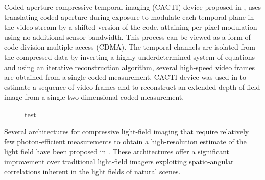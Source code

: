 \documentclass[journal]{IEEEtran}
\begin{document}
Coded aperture compressive temporal imaging (CACTI) device proposed in \cite{Llull2013}, uses translating coded aperture during exposure to modulate each temporal plane in the video stream by a shifted version of the code, attaining per-pixel modulation using no additional sensor bandwidth. This process can be viewed as a form of code division multiple access (CDMA). The temporal channels are isolated from the compressed data by inverting a highly underdetermined system of equations and using an iterative reconstruction algorithm, several high-speed video frames are obtained from a single coded measurement. CACTI device was used in \cite{Llull2014} to estimate a sequence of video frames and to reconstruct an extended depth of field image from a single two-dimensional coded measurement.

\begin{figure}
	\centering
	
	\label{fig:temporal_cs}
	
	\caption{test}
\end{figure}


Several architectures for compressive light-field imaging that require relatively few photon-efficient measurements to obtain a high-resolution estimate of the light field have been proposed in \cite{Ashok2010, Babacan2012, Marwah2013}. These architectures offer a significant improvement over traditional light-field imagers exploiting spatio-angular correlations inherent in the light fields of natural scenes.



 

\end{document}
